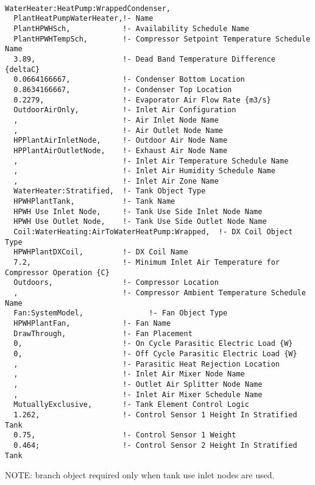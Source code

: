 \begin{lstlisting}

WaterHeater:HeatPump:WrappedCondenser,
  PlantHeatPumpWaterHeater,!- Name
  PlantHPWHSch,            !- Availability Schedule Name
  PlantHPWHTempSch,        !- Compressor Setpoint Temperature Schedule Name
  3.89,                    !- Dead Band Temperature Difference {deltaC}
  0.0664166667,            !- Condenser Bottom Location
  0.8634166667,            !- Condenser Top Location
  0.2279,                  !- Evaporator Air Flow Rate {m3/s}
  OutdoorAirOnly,          !- Inlet Air Configuration
  ,                        !- Air Inlet Node Name
  ,                        !- Air Outlet Node Name
  HPPlantAirInletNode,     !- Outdoor Air Node Name
  HPPlantAirOutletNode,    !- Exhaust Air Node Name
  ,                        !- Inlet Air Temperature Schedule Name
  ,                        !- Inlet Air Humidity Schedule Name
  ,                        !- Inlet Air Zone Name
  WaterHeater:Stratified,  !- Tank Object Type
  HPWHPlantTank,           !- Tank Name
  HPWH Use Inlet Node,     !- Tank Use Side Inlet Node Name
  HPWH Use Outlet Node,    !- Tank Use Side Outlet Node Name
  Coil:WaterHeating:AirToWaterHeatPump:Wrapped,  !- DX Coil Object Type
  HPWHPlantDXCoil,         !- DX Coil Name
  7.2,                     !- Minimum Inlet Air Temperature for Compressor Operation {C}
  Outdoors,                !- Compressor Location
  ,                        !- Compressor Ambient Temperature Schedule Name
  Fan:SystemModel,               !- Fan Object Type
  HPWHPlantFan,            !- Fan Name
  DrawThrough,             !- Fan Placement
  0,                       !- On Cycle Parasitic Electric Load {W}
  0,                       !- Off Cycle Parasitic Electric Load {W}
  ,                        !- Parasitic Heat Rejection Location
  ,                        !- Inlet Air Mixer Node Name
  ,                        !- Outlet Air Splitter Node Name
  ,                        !- Inlet Air Mixer Schedule Name
  MutuallyExclusive,       !- Tank Element Control Logic
  1.262,                   !- Control Sensor 1 Height In Stratified Tank
  0.75,                    !- Control Sensor 1 Weight
  0.464;                   !- Control Sensor 2 Height In Stratified Tank
\end{lstlisting}

NOTE: branch object required only when tank use inlet nodes are used.

